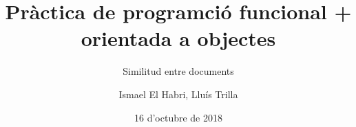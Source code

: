 \documentclass[11pt,a4paper,twoside]{report}
\begin{document}
\title{Pràctica de programció funcional + orientada a objectes}
\subtitle{Similitud entre documents}
\author{Ismael El Habri, Lluís Trilla}
\date{16 d'octubre de 2018}
\maketitle

\tableofcontents
\end{document}
